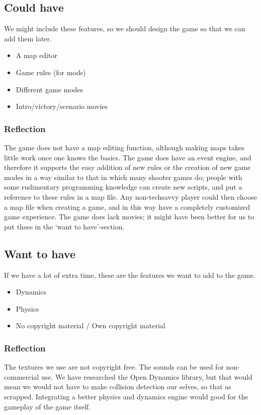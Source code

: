 \subsection{Could have} %
\label{sec:could_have}
We might include these features, so we should design the game so that we can add them later.

\begin{itemize}
  \item A map editor
  \item Game rules (for mods)
  \item Different game modes
  \item Intro/victory/scenario movies
\end{itemize}

\subsubsection{Reflection}
The game does not have a map editing function, although making maps takes little work once one knows the basics. The game does have an event engine, and therefore it supports the easy addition of new rules or the creation of new game modes in a way similar to that in which many shooter games do; people with some rudimentary programming knowledge can create new scripts, and put a reference to these rules in a map file. Any non-techsavvy player could then choose a map file when creating a game, and in this way have a completely customized game experience. The game does lack movies; it might have been better for us to put these in the `want to have'-section.

\subsection{Want to have} %
\label{sec:want_to_have}
If we have a lot of extra time, these are the features we want to add to the game.

\begin{itemize}
  \item Dynamics
  \item Physics
  \item No copyright material / Own copyright material
\end{itemize}

\subsubsection{Reflection}
The textures we use are not copyright free. The sounds can be used for non-commercial use. We have researched the Open Dynamics library, but that would mean we would not have to make collision detection our selves, so that as scrapped. Integrating a better physics and dynamics engine would good for the gameplay of the game itself.


